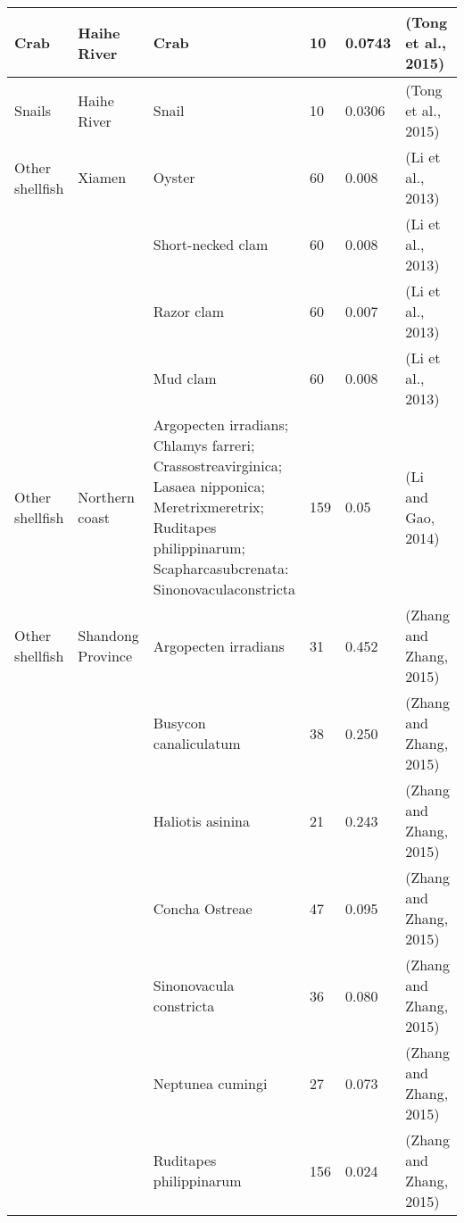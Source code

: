 \begin{center}
\begin{longtable}{ | p{2cm} | p{1.4cm} | p{3cm} | p{1.6cm} | p{1.9cm} | p{2.6cm} | }
 \\ \hline
Crab & Haihe River & Crab & 10 & 0.0743 & (Tong et al., 2015)
 \\ \hline
Snails & Haihe River & Snail & 10 & 0.0306 & (Tong et al., 2015)
 \\ \hline
Other shellfish & Xiamen & Oyster & 60 & 0.008  & (Li et al., 2013)  \\ \hline
 &  & Short-necked clam & 60 & 0.008  & (Li et al., 2013)  \\ \hline
 &  & Razor clam & 60 & 0.007  & (Li et al., 2013)  \\ \hline
 &  & Mud clam & 60 & 0.008  & (Li et al., 2013)  \\ \hline
Other shellfish & Northern coast  & Argopecten irradians; Chlamys farreri; Crassostreavirginica; Lasaea nipponica; Meretrixmeretrix; 
Ruditapes philippinarum; Scapharcasubcrenata: Sinonovaculaconstricta  & 159 & 0.05 
 & (Li and Gao, 2014)  \\ \hline
Other shellfish & Shandong Province & Argopecten irradians & 31 & 0.452  & (Zhang and Zhang, 2015)  \\ \hline
 &  & Busycon canaliculatum & 38 & 0.250  & (Zhang and Zhang, 2015)  \\ \hline
 &  & Haliotis asinina & 21 & 0.243  & (Zhang and Zhang, 2015)  \\ \hline
 &  & Concha Ostreae & 47 & 0.095  & (Zhang and Zhang, 2015)  \\ \hline
 &  & Sinonovacula constricta & 36 & 0.080  & (Zhang and Zhang, 2015)  \\ \hline
 &  & Neptunea cumingi & 27 & 0.073  & (Zhang and Zhang, 2015)  \\ \hline
 &  & Ruditapes philippinarum & 156 & 0.024  & (Zhang and Zhang, 2015)  \\ \hline
     \end{longtable}
\end{center}
